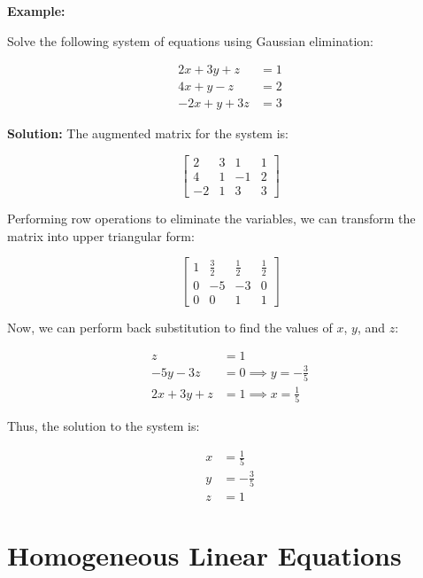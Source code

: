 \textbf{Example:}

Solve the following system of equations using Gaussian elimination:

\begin{align*}
    2x + 3y + z  & = 1 \\
    4x + y - z   & = 2 \\
    -2x + y + 3z & = 3
\end{align*}

\textbf{Solution:} The augmented matrix for the system is:

\[
    \left[
    \begin{array}{ccc|c}
        2  & 3 & 1  & 1 \\
        4  & 1 & -1 & 2 \\
        -2 & 1 & 3  & 3
    \end{array}
    \right]
\]

Performing row operations to eliminate the variables, we can transform the matrix into upper triangular form:

\[
    \left[
    \begin{array}{ccc|c}
        1 & \frac{3}{2} & \frac{1}{2} & \frac{1}{2} \\
        0 & -5          & -3          & 0           \\
        0 & 0           & 1           & 1
    \end{array}
    \right]
\]

Now, we can perform back substitution to find the values of \(x\), \(y\), and \(z\):

\begin{align*}
    z           & = 1                           \\
    -5y - 3z    & = 0 \implies y = -\frac{3}{5} \\
    2x + 3y + z & = 1 \implies x = \frac{1}{5}
\end{align*}

Thus, the solution to the system is:

\begin{align*}
    x & = \frac{1}{5}  \\
    y & = -\frac{3}{5} \\
    z & = 1
\end{align*}

\section{Homogeneous Linear Equations}

